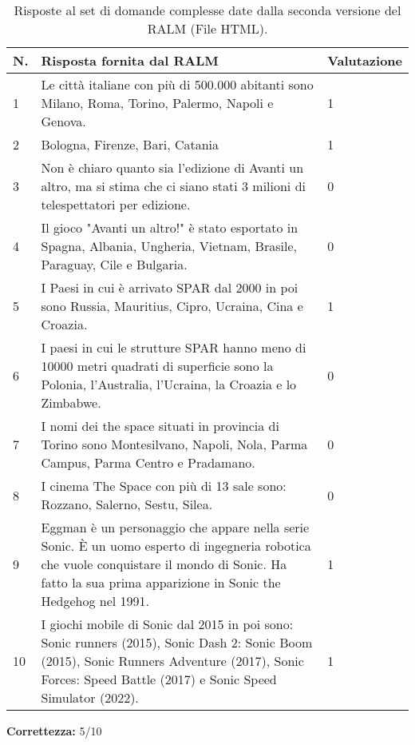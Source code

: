 \begin{table}[H]
    \centering
    \begin{tabular}{|p{0.5cm} |p{6cm} |p{2cm}|}
        \hline
        \textbf{N}. & \textbf{Risposta fornita dal RALM} & \textbf{Valutazione} \\
        \hline
        1 & Le città italiane con più di 500.000 abitanti sono Milano, Roma, Torino, Palermo, Napoli e Genova. & 1 \\
        \hline
        2 & Bologna, Firenze, Bari, Catania & 1 \\
        \hline
        3 & Non è chiaro quanto sia l'edizione di Avanti un altro, ma si stima che ci siano stati 3 milioni di telespettatori per edizione. & 0 \\
        \hline
        4 & Il gioco "Avanti un altro!" è stato esportato in Spagna, Albania, Ungheria, Vietnam, Brasile, Paraguay, Cile e Bulgaria. & 0 \\
        \hline
        5 & I Paesi in cui è arrivato SPAR dal 2000 in poi sono Russia, Mauritius, Cipro, Ucraina, Cina e Croazia. & 1 \\
        \hline
        6 & I paesi in cui le strutture SPAR hanno meno di 10000 metri quadrati di superficie sono la Polonia, l'Australia, l'Ucraina, la Croazia e lo Zimbabwe. & 0 \\
        \hline
        7 & I nomi dei the space situati in provincia di Torino sono Montesilvano, Napoli, Nola, Parma Campus, Parma Centro e Pradamano. & 0 \\
        \hline
        8 & I cinema The Space con più di 13 sale sono: Rozzano, Salerno, Sestu, Silea. & 0 \\
        \hline
        9 & Eggman è un personaggio che appare nella serie Sonic. È un uomo esperto di ingegneria robotica che vuole conquistare il mondo di Sonic. Ha fatto la sua prima apparizione in Sonic the Hedgehog nel 1991.  & 1 \\
        \hline
        10 & I giochi mobile di Sonic dal 2015 in poi sono: Sonic runners (2015), Sonic Dash 2: Sonic Boom (2015), Sonic Runners Adventure (2017), Sonic Forces: Speed Battle (2017) e Sonic Speed Simulator (2022). & 1 \\
        \hline
    \end{tabular}
    \caption{Risposte al set di domande complesse date dalla seconda versione del RALM (File HTML).}
\end{table}

\textbf{Correttezza:} 5/10


